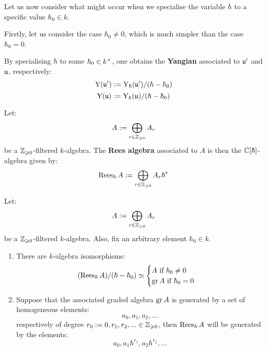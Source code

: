         Let us now consider what might occur when we specialise the variable $\hbar$ to a specific value $\hbar_0 \in k$.

        Firstly, let us consider the case $\hbar_0 \not = 0$, which is much simpler than the case $\hbar_0 = 0$. 
        \begin{definition} \label{def: yangians_associated_to_symmetrisable_kac_moody_algebras}
            By specialising $\hbar$ to some $\hbar_0 \in k^{\x}$, one obtains the \textbf{Yangian} associated to $\mathfrak{u}'$ and $\mathfrak{u}$, respectively:
                $$\mathrm{Y}(\mathfrak{u}') := \mathrm{Y}_{\hbar}(\mathfrak{u}')/(\hbar - \hbar_0)$$
                $$\mathrm{Y}(\mathfrak{u}) := \mathrm{Y}_{\hbar}(\mathfrak{u})/(\hbar - \hbar_0)$$
        \end{definition}
        \begin{definition} \label{def: rees_algebras}
            Let:
                $$A := \bigoplus_{r \in \mathbb{Z}_{\geqslant 0}} A_r$$
            be a $\mathbb{Z}_{\geqslant 0}$-filtered $k$-algebra. The \textbf{Rees algebra} associated to $A$ is then the $\mathbb{C}[\hbar]$-algebra given by:
                $$\operatorname{Rees}_{\hbar} A := \bigoplus_{r \in \mathbb{Z}_{\geqslant 0}} A_r \hbar^r$$
        \end{definition}
        \begin{lemma} \label{lemma: basic_properties_of_rees_algebras}
            \cite[Exercise I.9.5]{kassel_quantum_groups} Let:
                $$A := \bigoplus_{r \in \mathbb{Z}_{\geqslant 0}} A_r$$
            be a $\mathbb{Z}_{\geqslant 0}$-filtered $k$-algebra. Also, fix an arbitrary element $\hbar_0 \in k$.
            \begin{enumerate}
                \item There are $k$-algebra isomorphisms:
                    $$
                        (\operatorname{Rees}_{\hbar} A)/(\hbar - \hbar_0) \simeq
                        \begin{cases}
                            \text{$A$ if $\hbar_0 \not = 0$}
                            \\
                            \text{$\operatorname{gr} A$ if $\hbar_0 = 0$}
                        \end{cases}
                    $$
                \item Suppose that the associated graded algebra $\operatorname{gr} A$ is generated by a set of homogeneous elements:
                    $$a_0, a_1, a_2, ...$$
                respectively of degree $r_0 := 0, r_1, r_2, ... \in \mathbb{Z}_{\geqslant 0}$, then $\operatorname{Rees}_{\hbar} A$ will be generated by the elements:
                    $$a_0, a_1 \hbar^{r_1}, a_2 \hbar^{r_2}, ...$$
            \end{enumerate}
        \end{lemma}

